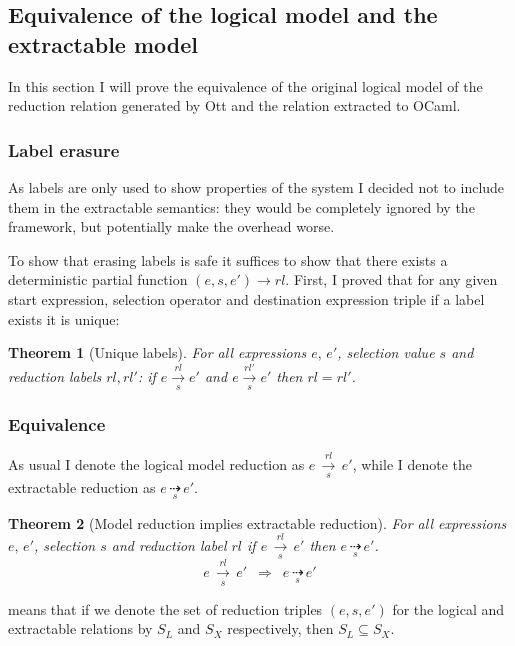 \documentclass[12pt,twoside,notitlepage]{report}
\theoremstyle{plain}%
\newtheorem{thm}{Theorem}[section]
\theoremstyle{definition}
\theoremstyle{remark}
\begin{document}
\subsection{Equivalence of the logical model and the extractable model}
In this section I will prove the equivalence of the original logical model of the reduction relation generated by Ott and the relation extracted to OCaml.
\subsubsection{Label erasure}
As labels are only used to show properties of the system I decided not to include them in the extractable semantics: they would be completely ignored by the framework, but potentially make the overhead worse.

To show that erasing labels is safe it suffices to show that there exists a deterministic partial function $ (e,s,e') \rightarrow rl $. First, I proved that for any given start expression, selection operator and destination expression triple if a label exists it is unique:
\begin{thm}[Unique labels]
\label{thm:unique_label}
For all expressions $ e,\, e'$, selection value $ s $ and reduction labels $ rl, rl' $:
 if $ e \overset{rl}{\underset{s}{\longrightarrow}}e' $ and $ e \overset{rl'}{\underset{s}{\longrightarrow}}e' $ then $ rl = rl' $. 
\end{thm}
\subsubsection{Equivalence}
As usual I denote the logical model reduction as $ e\, \underset{s}{\overset{rl}{\longrightarrow}}\, e' $, while I denote the extractable reduction as $ e\, \underset{s}{\dashrightarrow}\, e' $.

\begin{thm}[Model reduction implies extractable reduction]
\label{thm:jo_to_xjo}
For all expressions $ e,\,e' $, selection $ s $ and reduction label $ rl $ if $ e\, \underset{s}{\overset{rl}{\longrightarrow}}\, e' $ then $  e\, \underset{s}{\dashrightarrow}\, e' $.
\[  e\, \underset{s}{\overset{rl}{\longrightarrow}}\, e' \,\,\,\Rightarrow \,\,\, e\, \underset{s}{\dashrightarrow}\, e' \]
\end{thm}

 means that if we denote the set of reduction triples $ (e,s,e') $ for the logical and extractable relations by $ S_L $ and $ S_X $ respectively, then $ S_L \subseteq S_X $.
\end{document}
